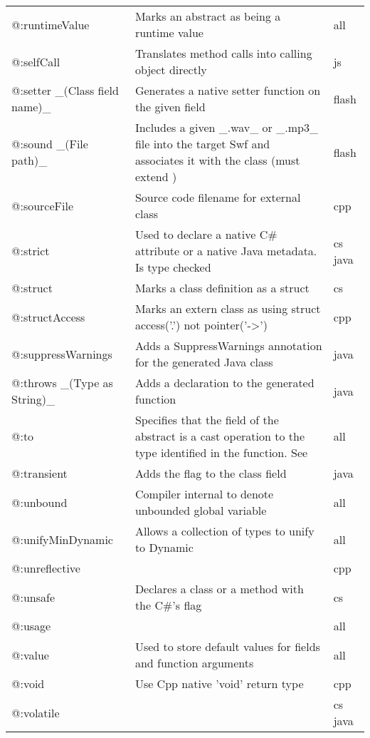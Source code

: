 \begin{center}
\begin{tabular}{| l | l | l |}
	@:runtimeValue  &  Marks an abstract as being a runtime value  &  all \\
	@:selfCall  &  Translates method calls into calling object directly  &  js \\
	@:setter \_(Class field name)\_  &  Generates a native setter function on the given field   &  flash \\
	@:sound \_(File path)\_  &  Includes a given \_.wav\_ or \_.mp3\_ file into the target Swf and associates it with the class (must extend \expr{flash.media.Sound})  &  flash \\
	@:sourceFile  &  Source code filename for external class  &  cpp \\
	@:strict  &  Used to declare a native C\# attribute or a native Java metadata. Is type checked  &  cs java \\
	@:struct  &  Marks a class definition as a struct   &  cs \\
	@:structAccess  &  Marks an extern class as using struct access('.') not pointer('->')  &  cpp \\
	@:suppressWarnings  &  Adds a SuppressWarnings annotation for the generated Java class  &  java \\
	@:throws \_(Type as String)\_  &  Adds a \expr{throws} declaration to the generated function   &  java \\
	@:to  &  Specifies that the field of the abstract is a cast operation to the type identified in the function. See \tref{Implicit Casts}{types-abstract-implicit-casts} & all \\
	@:transient  &  Adds the \expr{transient} flag to the class field  &  java \\
	@:unbound  &  Compiler internal to denote unbounded global variable  &  all \\
	@:unifyMinDynamic  &  Allows a collection of types to unify to Dynamic  &  all \\
	@:unreflective  &    &  cpp \\
	@:unsafe  &  Declares a class  or a method with the C\#'s \expr{unsafe} flag   &  cs \\
	@:usage  &    &  all \\
	@:value  &  Used to store default values for fields and function arguments  &  all \\
	@:void  &  Use Cpp native 'void' return type  &  cpp \\
	@:volatile  &    &  cs  java \\
\end{tabular}
\end{center}

